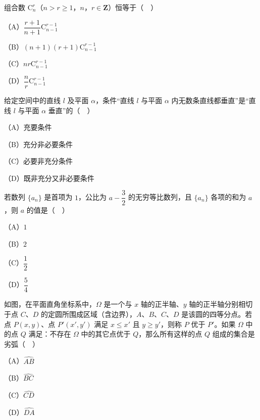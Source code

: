 \begin{question}
组合数 $\mathrm C_n^r$（$n>r\geqslant1$，$n$，$r\in\mathbf Z$）恒等于（　）

（A）$\dfrac{r+1}{n+1}\mathrm C_{n-1}^{r-1}$

（B）$(n+1)(r+1)\mathrm C_{n-1}^{r-1}$

（C）$nr\mathrm C_{n-1}^{r-1}$

（D）$\dfrac nr\mathrm C_{n-1}^{r-1}$

\end{question}
\begin{question}
给定空间中的直线 $l$ 及平面 $\alpha$，条件“直线 $l$ 与平面 $\alpha$ 内无数条直线都垂直”是“直线 $l$ 与平面 $\alpha$ 垂直”的（　）

（A）充要条件

（B）充分非必要条件

（C）必要非充分条件

（D）既非充分又非必要条件

\end{question}
\begingroup
\renewenvironment{question}{\Needspace{0.46\textheight}}{}
\begin{question}
若数列 $\{a_n\}$ 是首项为 $1$，公比为 $a-\dfrac32$ 的无穷等比数列，且 $\{a_n\}$ 各项的和为 $a$，则 $a$ 的值是（　）

（A）$1$

（B）$2$

（C）$\dfrac12$

（D）$\dfrac54$

\Needspace{0.4\textheight}
\end{question}
\endgroup
\begin{question}
如图，在平面直角坐标系中，$\Omega$ 是一个与 $x$ 轴的正半轴、$y$ 轴的正半轴分别相切于点 $C$、$D$ 的定圆所围成区域（含边界），$A$、$B$、$C$、$D$ 是该圆的四等分点。若点 $P(x,y)$、点 $P'(x',y')$ 满足 $x\leqslant x'$ 且 $y\geqslant y'$，则称 $P$ 优于 $P'$。如果 $\Omega$ 中的点 $Q$ 满足：不存在 $\Omega$ 中的其它点优于 $Q$，那么所有这样的点 $Q$ 组成的集合是劣弧（　）
\nopagebreak[4]
\begin{center}\end{center}
\nopagebreak[4]
（A）$\widehat{AB}$

（B）$\widehat{BC}$

（C）$\widehat{CD}$

（D）$\widehat{DA}$

\end{question}

